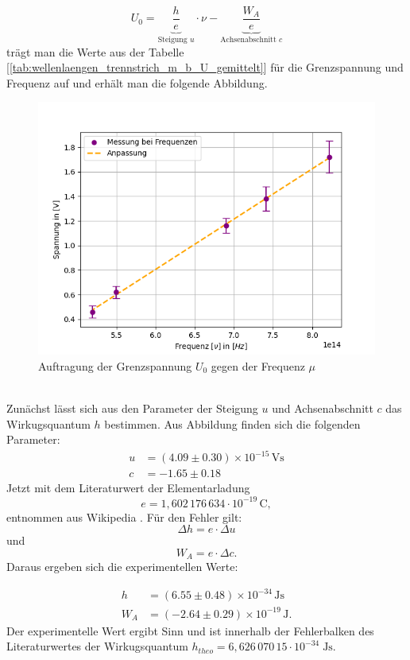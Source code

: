 \documentclass{article}
\begin{document}
\begin{equation}
  U_0 = \underbrace{\frac{h}{e}}_{\text{Steigung } u} \cdot \nu - \underbrace{\frac{W_A}{e}}_{\text{Achsenabschnitt } c}
\end{equation}
trägt man die Werte aus der Tabelle [\ref*{tab:wellenlaengen_trennstrich_m_b_U_gemittelt}] für die Grenzspannung und Frequenz auf 
und erhält man die folgende Abbildung.\\
\begin{figure}[h!]
  \centering
  \includegraphics[width=.5\linewidth]{402_wirkung}
  \caption{Auftragung der Grenzspannung $U_0$ gegen der Frequenz $\mu$}
  \label{fig:wirkungs}
\end{figure}
\\ Zunächst lässt sich aus den Parameter der Steigung $u$ und Achsenabschnitt $c$ das
 Wirkugsquantum $h$ bestimmen. Aus Abbildung finden sich die folgenden Parameter: 
\begin{align}
  u &= (4.09 \pm 0.30) \times 10^{-15} \, \mathrm{Vs}\\
  c &= -1.65 \pm 0.18
\end{align}
Jetzt mit dem Literaturwert der Elementarladung  
\[
e = 1{,}602\,176\,634 \cdot 10^{-19}\,\mathrm{C},
\]  
entnommen aus Wikipedia \cite{elementarladung}. Für den Fehler gilt:  
\[
\Delta h = e \cdot \Delta u
\]
und  
\[
W_A = e \cdot \Delta c.
\]
Daraus ergeben sich die experimentellen Werte:


\begin{align}
  h &= (6.55 \pm 0.48) \times 10^{-34} \, \mathrm{Js}\\
  W_A &=(-2.64 \pm 0.29) \times 10^{-19} \, \mathrm{J}.
\end{align}
Der experimentelle Wert ergibt Sinn und ist innerhalb der Fehlerbalken des 
 Literaturwertes der Wirkugsquantum 
 ${\displaystyle h_{theo}=6{,}626\,070\,15\cdot 10^{-34}\;\mathrm {Js} }$. \cite{planck-h}

\clearpage
\end{document}
